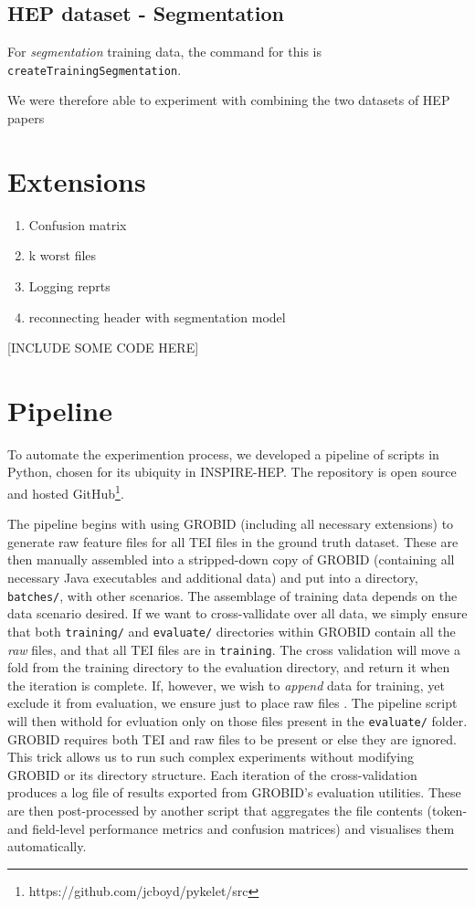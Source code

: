 \subsection{HEP dataset - Segmentation}
\label{subsec:hepdatasetsegmentation}

For \emph{segmentation} training data, the command for this is \texttt{createTrainingSegmentation}. 

We were therefore able to experiment with combining the two datasets of HEP papers

\section{Extensions}

\begin{enumerate}
\item Confusion matrix
\item k worst files
\item Logging reprts
\item reconnecting header with segmentation model
\end{enumerate}

[INCLUDE SOME CODE HERE]

\section{Pipeline}

To automate the experimention process, we developed a pipeline of scripts in Python, chosen for its ubiquity in INSPIRE-HEP. The repository is open source and hosted GitHub\footnote{https://github.com/jcboyd/pykelet/src}. 

The pipeline begins with using GROBID (including all necessary extensions) to generate raw feature files for all TEI files in the ground truth dataset. These are then manually assembled into a stripped-down copy of GROBID (containing all necessary Java executables and additional data) and put into a directory, \texttt{batches/}, with other scenarios. The assemblage of training data depends on the data scenario desired. If we want to cross-vallidate over all data, we simply ensure that both \texttt{training/} and \texttt{evaluate/} directories within GROBID contain all the \emph{raw} files, and that all TEI files are in \texttt{training}. The cross validation will move a fold from the training directory to the evaluation directory, and return it when the iteration is complete. If, however, we wish to \emph{append} data for training, yet exclude it from evaluation, we ensure just to place raw files . The pipeline script will then withold for evluation only on those files present in the \texttt{evaluate/} folder. GROBID requires both TEI and raw files to be present or else they are ignored. This trick allows us to run such complex experiments without modifying GROBID or its directory structure. Each iteration of the cross-validation produces a log file of results exported from GROBID's evaluation utilities. These are then post-processed by another script that aggregates the file contents (token- and field-level performance metrics and confusion matrices) and visualises them automatically.

